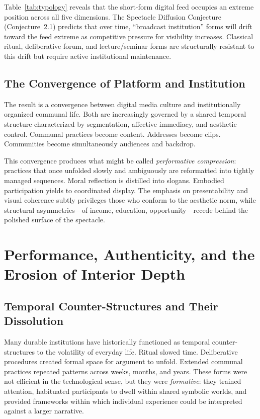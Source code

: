 \documentclass[12pt]{article}
\theoremstyle{definition}
\theoremstyle{plain}
\begin{document}
Table~\ref{tab:typology} reveals that the short-form digital feed occupies an extreme position across all five dimensions. The Spectacle Diffusion Conjecture (Conjecture~2.1) predicts that over time, ``broadcast institution'' forms will drift toward the feed extreme as competitive pressure for visibility increases. Classical ritual, deliberative forum, and lecture/seminar forms are structurally resistant to this drift but require active institutional maintenance.

\subsection{The Convergence of Platform and Institution}

The result is a convergence between digital media culture and institutionally organized communal life. Both are increasingly governed by a shared temporal structure characterized by segmentation, affective immediacy, and aesthetic control. Communal practices become content. Addresses become clips. Communities become simultaneously audiences and backdrop.

This convergence produces what might be called \emph{performative compression}: practices that once unfolded slowly and ambiguously are reformatted into tightly managed sequences. Moral reflection is distilled into slogans. Embodied participation yields to coordinated display. The emphasis on presentability and visual coherence subtly privileges those who conform to the aesthetic norm, while structural asymmetries---of income, education, opportunity---recede behind the polished surface of the spectacle.

\section{Performance, Authenticity, and the Erosion of Interior Depth}
\label{sec:belief}

\subsection{Temporal Counter-Structures and Their Dissolution}

Many durable institutions have historically functioned as temporal counter-structures to the volatility of everyday life. Ritual slowed time. Deliberative procedures created formal space for argument to unfold. Extended communal practices repeated patterns across weeks, months, and years. These forms were not efficient in the technological sense, but they were \emph{formative}: they trained attention, habituated participants to dwell within shared symbolic worlds, and provided frameworks within which individual experience could be interpreted against a larger narrative.
\end{document}
